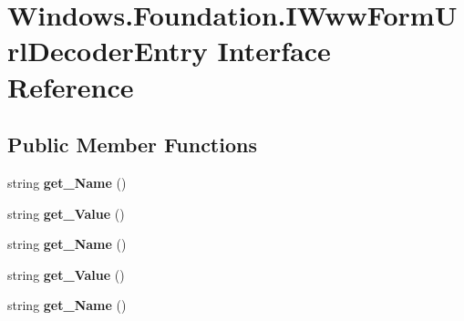 \hypertarget{interface_windows_1_1_foundation_1_1_i_www_form_url_decoder_entry}{}\section{Windows.\+Foundation.\+I\+Www\+Form\+Url\+Decoder\+Entry Interface Reference}
\label{interface_windows_1_1_foundation_1_1_i_www_form_url_decoder_entry}
\subsection*{Public Member Functions}
\begin{DoxyCompactItemize}
\item 
\mbox{\label{interface_windows_1_1_foundation_1_1_i_www_form_url_decoder_entry_a385f9adec1cab0915c8eaa166e7b316d}} 
string {\bfseries get\+\_\+\+Name} ()
\item 
\mbox{\label{interface_windows_1_1_foundation_1_1_i_www_form_url_decoder_entry_a8bf99a4c054f99a89891281e55fdd396}} 
string {\bfseries get\+\_\+\+Value} ()
\item 
\mbox{\label{interface_windows_1_1_foundation_1_1_i_www_form_url_decoder_entry_a385f9adec1cab0915c8eaa166e7b316d}} 
string {\bfseries get\+\_\+\+Name} ()
\item 
\mbox{\label{interface_windows_1_1_foundation_1_1_i_www_form_url_decoder_entry_a8bf99a4c054f99a89891281e55fdd396}} 
string {\bfseries get\+\_\+\+Value} ()
\item 
\mbox{\label{interface_windows_1_1_foundation_1_1_i_www_form_url_decoder_entry_a385f9adec1cab0915c8eaa166e7b316d}} 
string {\bfseries get\+\_\+\+Name} ()
\item 
\mbox{\label{interface_windows_1_1_foundation_1_1_i_www_form_url_decoder_entry_a8bf99a4c054f99a89891281e55fdd396}} 

\end{DoxyCompactItemize}
